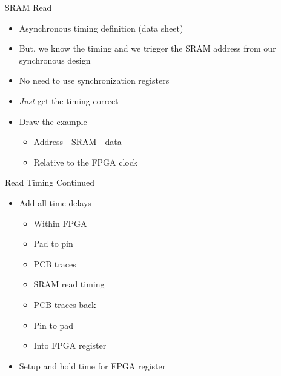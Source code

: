 \begin{frame}[fragile]{SRAM Read}
\begin{itemize}
\item Asynchronous timing definition (data sheet)
\item But, we know the timing and we trigger the SRAM address from
our synchronous design
\item No need to use synchronization registers
\item \emph{Just} get the timing correct
\item Draw the example
\begin{itemize}
\item Address - SRAM - data
\item Relative to the FPGA clock
\end{itemize}
\end{itemize}
\end{frame}

\begin{frame}[fragile]{Read Timing Continued}
\begin{itemize}
\item Add all time delays
\begin{itemize}
\item Within FPGA
\item Pad to pin
\item PCB traces
\item SRAM read timing
\item PCB traces back
\item Pin to pad
\item Into FPGA register
\end{itemize}
\item Setup and hold time for FPGA register
\end{itemize}
\end{frame}

